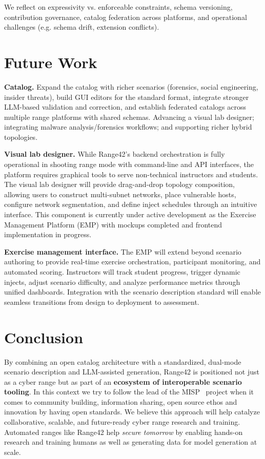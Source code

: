\documentclass[11pt]{article}
\begin{document}
We reflect on expressivity vs. enforceable constraints, schema versioning, contribution governance, catalog federation across platforms, and operational challenges (e.g. schema drift, extension conflicts).

\section{Future Work}

\textbf{Catalog.}
Expand the catalog with richer scenarios (forensics, social engineering, insider threats), build GUI editors for the standard format, integrate stronger LLM-based validation and correction, and establish federated catalogs across multiple range platforms with shared schemas. Advancing a visual lab designer; integrating malware analysis/forensics workflows; and supporting richer hybrid topologies.

\textbf{Visual lab designer.}
While Range42's backend orchestration is fully operational in shooting range mode with command-line and API interfaces,
the platform requires graphical tools to serve non-technical instructors and students.
The visual lab designer will provide drag-and-drop topology composition, allowing users to construct multi-subnet networks, place vulnerable hosts, configure network segmentation, and define inject schedules through an intuitive interface.
This component is currently under active development as the Exercise Management Platform (EMP) with mockups completed and frontend implementation in progress.

\textbf{Exercise management interface.}
The EMP will extend beyond scenario authoring to provide real-time exercise orchestration, participant monitoring, and automated scoring.
Instructors will track student progress, trigger dynamic injects, adjust scenario difficulty, and analyze performance metrics through unified dashboards.
Integration with the scenario description standard will enable seamless transitions from design to deployment to assessment.


\section{Conclusion}
By combining an open catalog architecture with a standardized, dual-mode scenario description and LLM-assisted generation, Range42 is positioned not just as a cyber range but as part of an \textbf{ecosystem of interoperable scenario tooling}. In this context we try to follow the lead of the MISP~\cite{misp} project when it comes to community building, information sharing, open source ethos and innovation by having open standards.
We believe this approach will help catalyze collaborative, scalable, and future-ready cyber range research and training.
Automated ranges like Range42 help \emph{secure tomorrow} by enabling hands-on research and training humans as well as generating data for model generation at scale.
\end{document}
